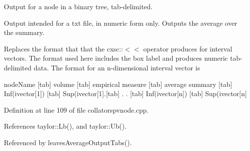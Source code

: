 \-Output for a node in a binary tree, tab-\/delimited. 

\-Output intended for a txt file, in numeric form only. \-Outputs the average over the summary.

\-Replaces the format that that the cxsc\-:\-:$<$$<$ operator produces for interval vectors. \-The format used here includes the box label and produces numeric tab-\/delimited data. \-The format for an n-\/dimensional interval vector is

node\-Name \mbox{[}tab\mbox{]} volume \mbox{[}tab\mbox{]} empirical measure \mbox{[}tab\mbox{]} average summary \mbox{[}tab\mbox{]} \-Inf(ivector\mbox{[}1\mbox{]}) \mbox{[}tab\mbox{]} \-Sup(ivector\mbox{[}1\mbox{]}.\mbox{[}tab\mbox{]} . . \mbox{[}tab\mbox{]} \-Inf(ivector\mbox{[}n\mbox{]}) \mbox{[}tab\mbox{]} \-Sup(ivector\mbox{[}n\mbox{]} 

\-Definition at line 109 of file collatorspvnode.\-cpp.



\-References taylor\-::\-Lb(), and taylor\-::\-Ub().



\-Referenced by leaves\-Average\-Output\-Tabs().



